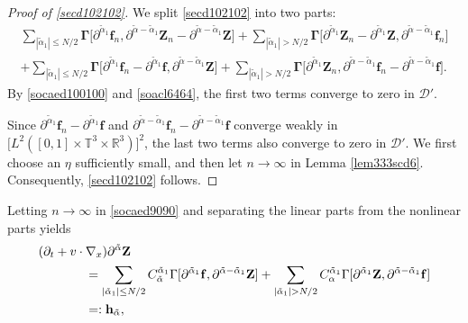 \documentclass[reqno]{amsart}
\numberwithin{equation}{section}
\numberwithin{equation}{section}
\begin{document}
		\begin{proof}[Proof of \eqref{secd102102}]
		We split \eqref{secd102102} into two parts:
		\begin{align*}
		\sum_{|\tilde{\alpha}_1| \leq N/2} \bm{\Gamma}\big[\partial^{\tilde{\alpha}_1} \mathbf{f}_n, \partial^{\tilde{\alpha} - \tilde{\alpha}_1} \mathbf{Z}_n - \partial^{\tilde{\alpha} - \tilde{\alpha}_1} \mathbf{Z}\big] + \sum_{|\tilde{\alpha}_1| > N/2} \bm{\Gamma}\big[\partial^{\tilde{\alpha}_1} \mathbf{Z}_n - \partial^{\tilde{\alpha}_1} \mathbf{Z}, \partial^{\tilde{\alpha} - \tilde{\alpha}_1} \mathbf{f}_n\big]\\
		+ \sum_{|\tilde{\alpha}_1| \leq N/2} \bm{\Gamma}\big[\partial^{\tilde{\alpha}_1} \mathbf{f}_n - \partial^{\tilde{\alpha}_1} \mathbf{f}, \partial^{\tilde{\alpha} - \tilde{\alpha}_1} \mathbf{Z}\big] + \sum_{|\tilde{\alpha}_1| > N/2} \bm{\Gamma}\big[\partial^{\tilde{\alpha}_1} \mathbf{Z}_n, \partial^{\tilde{\alpha} - \tilde{\alpha}_1} \mathbf{f}_n - \partial^{\tilde{\alpha} - \tilde{\alpha}_1} \mathbf{f}\big].
		\end{align*}
		By \eqref{socaed100100} and \eqref{soacl6464}, the first two terms converge to zero in $\mathcal{D}'$. 
		
		Since $\partial^{\tilde{\alpha}_1} \mathbf{f}_n - \partial^{\tilde{\alpha}_1} \mathbf{f}$ and $\partial^{\tilde{\alpha} - \tilde{\alpha}_1} \mathbf{f}_n - \partial^{\tilde{\alpha} - \tilde{\alpha}_1} \mathbf{f}$ converge weakly in $\big[L^2([0,1] \times \mathbb{T}^3 \times \mathbb{R}^3)\big]^2$, the last two terms also converge to zero in $\mathcal{D}'$. We first choose an $\eta$ ‌sufficiently small, and then let $n \to \infty$ in Lemma \ref{lem333scd6}. Consequently, \eqref{secd102102} follows.
		\end{proof}
		Letting $n \to \infty$ in \eqref{socaed9090} and separating the linear parts from the nonlinear parts yields
		\begin{align}
			&(\partial_t + v \cdot \nabla_x) \partial^{\tilde{\alpha}} \mathbf{Z} \notag\\
			&\hspace{1.3cm}= \sum_{|\tilde{\alpha}_1| \leq N/2} C_{\tilde{\alpha}}^{\tilde{\alpha}_1} \Gamma[\partial^{\tilde{\alpha}_1} \mathbf{f}, \partial^{\tilde{\alpha} - \tilde{\alpha}_1} \mathbf{Z}] + \sum_{|\tilde{\alpha}_1| > N/2} C_\alpha^{\tilde{\alpha}_1} \Gamma[\partial^{\tilde{\alpha}_1} \mathbf{Z}, \partial^{\tilde{\alpha} - \tilde{\alpha}_1} \mathbf{f}]\notag \\
			&\hspace{1.3cm}=: \mathbf{h}_{\tilde{\alpha}}, \label{socad103103}
		\end{align}
\end{document}
